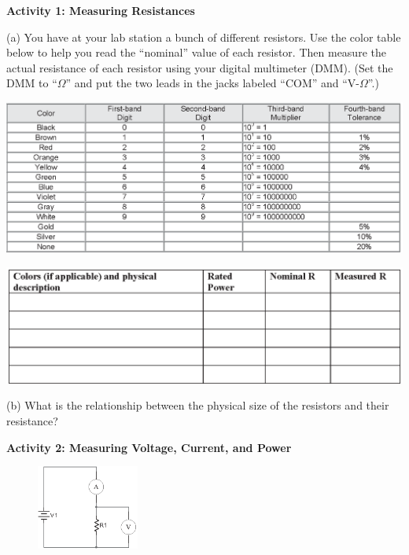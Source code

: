 \textbf{Activity 1: Measuring Resistances}

(a) You have at your lab station a bunch of different resistors.  Use the color table below to help you read the ``nominal'' value of each resistor.  Then measure the actual resistance of each resistor using your digital multimeter (DMM).  (Set the DMM to ``$\Omega$'' and put the two leads in the jacks labeled ``COM'' and ``V-$\Omega$''.)

\begin{center}
\includegraphics[width=1.0\textwidth]{electric_power/color_code.eps}

\vspace{0.2in}
\includegraphics[width=1.0\textwidth]{electric_power/resistor_description.eps}
\end{center}

(b) What is the relationship between the physical size of the resistors and their resistance?
\vspace{1.0in}

\pagebreak
\textbf{Activity 2: Measuring Voltage, Current, and Power}

\begin{figure}
    \vspace{-0.4 in}
    \includegraphics[width=0.3\textwidth]{electric_power/circ_diagram_bw.eps}
\end{figure}

